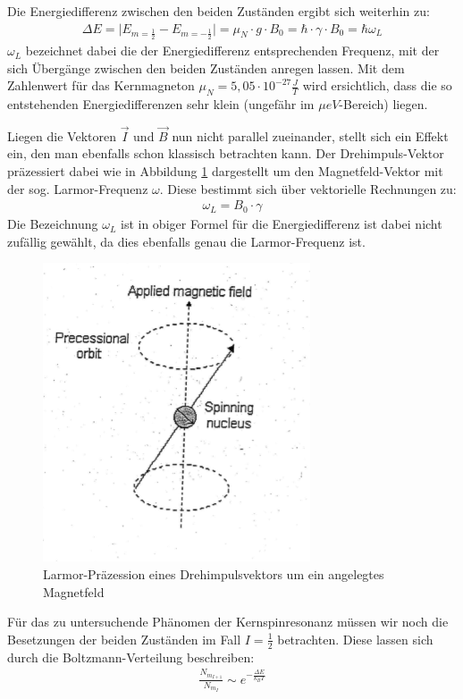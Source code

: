 Die Energiedifferenz zwischen den beiden Zuständen ergibt sich weiterhin zu:
\begin{align}
\Delta E = \vert E_{m=\frac{1}{2}} - E_{m=-\frac{1}{2}} \vert = \mu_N \cdot g \cdot B_0 = \hbar \cdot \gamma \cdot B_0 = \hbar \omega_L
\end{align}
$\omega_L$ bezeichnet dabei die der Energiedifferenz entsprechenden Frequenz, mit der sich Übergänge zwischen den beiden Zuständen anregen lassen. Mit dem Zahlenwert für das Kernmagneton $\mu_N=5,05 \cdot 10^{-27} \frac{J}{T}$ wird ersichtlich, dass die so entstehenden Energiedifferenzen sehr klein (ungefähr im $\mu eV$-Bereich) liegen.

Liegen die Vektoren $\overrightarrow{I}$ und $\overrightarrow{B}$ nun nicht parallel zueinander, stellt sich ein Effekt ein, den man ebenfalls schon klassisch betrachten kann. Der Drehimpuls-Vektor präzessiert dabei wie in Abbildung \ref{Larmor} dargestellt  um den Magnetfeld-Vektor mit der sog. Larmor-Frequenz $\omega$. Diese bestimmt sich über vektorielle Rechnungen zu:
\begin{align}
\omega_L=B_0 \cdot \gamma
\end{align}
Die Bezeichnung $\omega_L$ ist in obiger Formel für die Energiedifferenz ist dabei nicht zufällig gewählt, da dies ebenfalls genau die Larmor-Frequenz ist. 

\begin{figure}[htbp] 
     \includegraphics{Larmor.png}
  \caption{Larmor-Präzession eines Drehimpulsvektors um ein angelegtes Magnetfeld \cite{anleitung}}
  \label{Larmor}
\end{figure}

Für das zu untersuchende Phänomen der Kernspinresonanz müssen wir noch die Besetzungen der beiden Zuständen im Fall $I=\frac{1}{2}$ betrachten. Diese lassen sich durch die Boltzmann-Verteilung beschreiben:
\begin{align}
\frac{N_{m_{I+1}}}{N_{m_I}} \sim e^{-\frac{\Delta E}{k_BT}}
\end{align}

